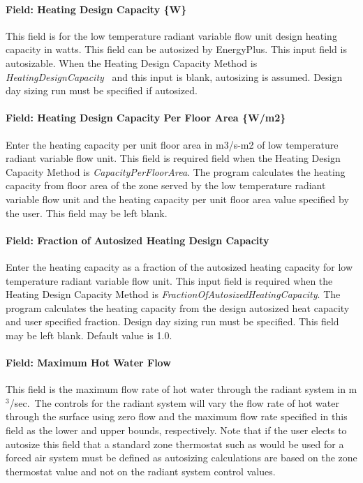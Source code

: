 \paragraph{Field: Heating Design Capacity \{W\}}\label{field-heating-design-capacity-w-5}

This field is for the low temperature radiant variable flow unit design heating capacity in watts. This field can be autosized by EnergyPlus. This input field is autosizable. When the Heating Design Capacity Method is \emph{HeatingDesignCapacity}~ and this input is blank, autosizing is assumed. Design day sizing run must be specified if autosized.

\paragraph{Field: Heating Design Capacity Per Floor Area \{W/m2\}}\label{field-heating-design-capacity-per-floor-area-wm2-5}

Enter the heating capacity per unit floor area in m3/s-m2 of low temperature radiant variable flow unit. This field is required field when the Heating Design Capacity Method is \emph{CapacityPerFloorArea}. The program calculates the heating capacity from floor area of the zone served by the low temperature radiant variable flow unit and the heating capacity per unit floor area value specified by the user. This field may be left blank.

\paragraph{Field: Fraction of Autosized Heating Design Capacity}\label{field-fraction-of-autosized-heating-design-capacity-5}

Enter the heating capacity as a fraction of the autosized heating capacity for low temperature radiant variable flow unit. This input field is required when the Heating Design Capacity Method is \emph{FractionOfAutosizedHeatingCapacity}. The program calculates the heating capacity from the design autosized heat capacity and user specified fraction. Design day sizing run must be specified. This field may be left blank. Default value is 1.0.

\paragraph{Field: Maximum Hot Water Flow}\label{field-maximum-hot-water-flow}

This field is the maximum flow rate of hot water through the radiant system in m\(^{3}\)/sec.~The controls for the radiant system will vary the flow rate of hot water through the surface using zero flow and the maximum flow rate specified in this field as the lower and upper bounds, respectively. Note that if the user elects to autosize this field that a standard zone thermostat such as would be used for a forced air system must be defined as autosizing calculations are based on the zone thermostat value and not on the radiant system control values.

